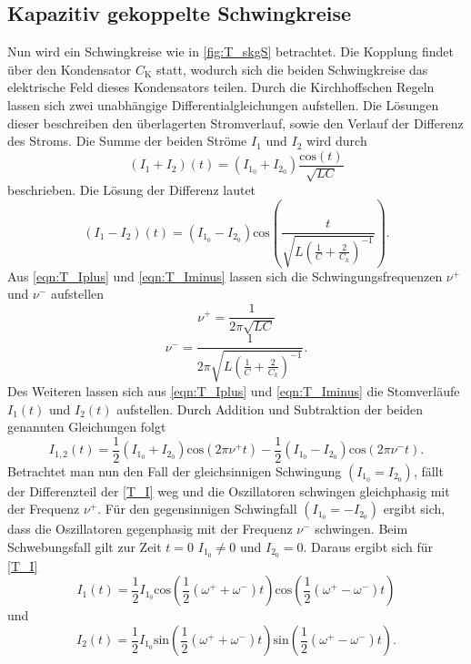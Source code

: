 \subsection{Kapazitiv gekoppelte Schwingkreise}
\label{T_KgS}
Nun wird ein Schwingkreise wie in \autoref{fig:T_skgS} betrachtet. Die Kopplung findet über den Kondensator $C_\text{K}$ statt, wodurch sich die beiden Schwingkreise das elektrische Feld dieses Kondensators
teilen. Durch die Kirchhoffschen Regeln lassen sich zwei unabhängige Differentialgleichungen aufstellen. Die Lösungen dieser beschreiben den überlagerten Stromverlauf,
sowie den Verlauf der Differenz des Stroms.
Die Summe der beiden Ströme $I_1$ und $I_2$ wird durch 
\begin{equation}
    \label{eqn:T_Iplus}
    \left(I_1 + I_2\right)\left(t\right) = \left(I_{1_0} + I_{2_0}\right)\frac{\text{cos}\left(t\right)}{\sqrt{LC}}
\end{equation}
beschrieben. Die Lösung der Differenz lautet
\begin{equation}
    \label{eqn:T_Iminus}
    \left(I_1 - I_2\right)\left(t\right) = \left(I_{1_0} - I_{2_0}\right)\text{cos}\left(\frac{t}{\sqrt{L\left(\frac{1}{C}+\frac{2}{C_k}\right)^{-1}}}\right).
\end{equation}
Aus \autoref{eqn:T_Iplus} und \autoref{eqn:T_Iminus} lassen sich die Schwingungsfrequenzen $\nu^+$ und $\nu^-$ aufstellen
\begin{equation}
    \label{eqn:T_nup}
    \nu^+ = \frac{1}{2\pi\sqrt{LC}}
\end{equation}
\begin{equation}
    \label{T_num}
    \nu^- =  \frac{1}{2\pi\sqrt{L\left(\frac{1}{C}+\frac{2}{C_k}\right)^{-1}}}.
\end{equation}
Des Weiteren lassen sich aus \autoref{eqn:T_Iplus} und \autoref{eqn:T_Iminus} die Stomverläufe $I_1(t)$ und $I_2(t)$ aufstellen. Durch Addition und Subtraktion der beiden genannten Gleichungen 
folgt 
\begin{equation}
    \label{T_I}
    I_{1,2}(t) = \frac{1}{2}\left(I_{1_0} + I_{2_0}\right)\text{cos}\left(2\pi\nu^+ t\right) - \frac{1}{2}\left(I_{1_0} - I_{2_0}\right)\text{cos}\left(2\pi\nu^- t\right).
\end{equation}
Betrachtet man nun den Fall der gleichsinnigen Schwingung $\left(I_{1_0} = I_{2_0}\right)$, fällt der Differenzteil der \autoref{T_I} weg und die Oszillatoren schwingen gleichphasig mit der Frequenz 
$\nu^+$.
Für den gegensinnigen Schwingfall $\left(I_{1_0} = -I_{2_0}\right)$ ergibt sich, dass die Oszillatoren gegenphasig mit der Frequenz $\nu^-$ schwingen.
Beim Schwebungsfall gilt zur Zeit $t = 0$ $I_{1_0}\neq 0$ und $I_{2_0} = 0$. Daraus ergibt sich für \autoref{T_I} 
\begin{equation*}
    I_1(t) = \frac{1}{2} I_{1_0}\text{cos}\left(\frac{1}{2}(\omega^+ + \omega^-)t\right) \text{cos}\left(\frac{1}{2}(\omega^+ - \omega^-)t\right)
\end{equation*}
und
\begin{equation*}
    I_2(t) = \frac{1}{2} I_{1_0}\text{sin}\left(\frac{1}{2}(\omega^+ + \omega^-)t\right) \text{sin}\left(\frac{1}{2}(\omega^+ - \omega^-)t\right).
\end{equation*}

